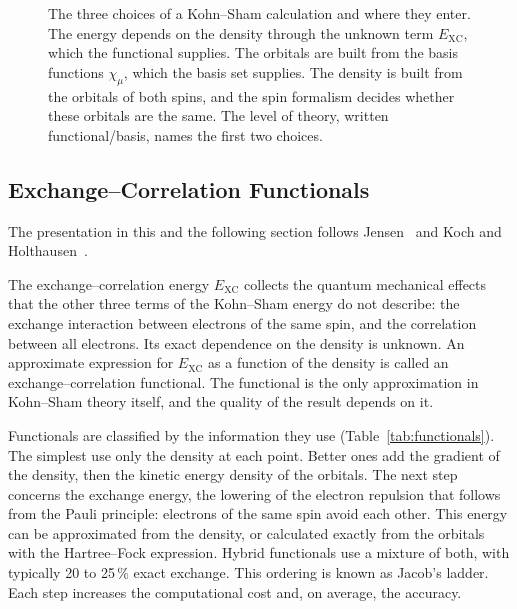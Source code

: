 \begin{figure}[h]
{%
}
\caption{The three choices of a Kohn--Sham calculation and where they enter.
The energy depends on the density through the unknown term $E_\text{XC}$,
which the functional supplies. The orbitals are built from the basis
functions $\chi_\mu$, which the basis set supplies. The density is built
from the orbitals of both spins, and the spin formalism decides whether
these orbitals are the same. The level of theory, written functional/basis,
names the first two choices.}
\label{fig:choices}
\end{figure}

\subsection{Exchange--Correlation Functionals}
\label{sec:background-functionals}

The presentation in this and the following section follows
Jensen~\cite{jensen2017} and Koch and Holthausen~\cite{koch2001}.

The exchange--correlation energy $E_\text{XC}$ collects the quantum
mechanical effects that the other three terms of the Kohn--Sham energy do
not describe: the exchange interaction between electrons of the same spin,
and the correlation between all electrons. Its exact dependence on the
density is unknown. An approximate expression for $E_\text{XC}$ as a
function of the density is called an exchange--correlation functional. The
functional is the only approximation in Kohn--Sham theory itself, and the
quality of the result depends on it.

Functionals are classified by the information they use
(Table~\ref{tab:functionals}). The simplest use only the density at each
point. Better ones add the gradient of the density, then the kinetic energy
density of the orbitals. The next step concerns the exchange energy, the
lowering of the electron repulsion that follows from the Pauli principle:
electrons of the same spin avoid each other. This energy can be
approximated from the density, or calculated exactly from the orbitals with
the Hartree--Fock expression. Hybrid functionals use a mixture of both, with
typically 20 to 25\,\% exact exchange. This ordering is known as Jacob's
ladder. Each step increases the computational cost and, on average, the
accuracy.

